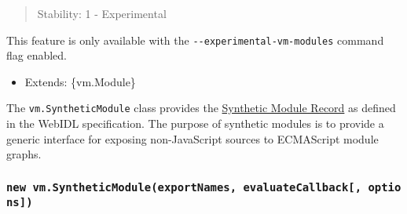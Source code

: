 \begin{quote}
Stability: 1 - Experimental
\end{quote}

This feature is only available with the
\texttt{-\/-experimental-vm-modules} command flag enabled.

\begin{itemize}
\tightlist
\item
  Extends: \{vm.Module\}
\end{itemize}

The \texttt{vm.SyntheticModule} class provides the
\href{https://heycam.github.io/webidl/\#synthetic-module-records}{Synthetic
Module Record} as defined in the WebIDL specification. The purpose of
synthetic modules is to provide a generic interface for exposing
non-JavaScript sources to ECMAScript module graphs.

\begin{Shaded}
\begin{Highlighting}[]
\OperatorTok{=} \NormalTok{(}\NormalTok{)}\OperatorTok{;}

\OperatorTok{=} \OperatorTok{;}
\OperatorTok{=} \NormalTok{([}\NormalTok{]}\OperatorTok{,} \NormalTok{() \{}
  \OperatorTok{=} \OperatorTok{;}
  \NormalTok{(}\OperatorTok{,}\OperatorTok{;}
\NormalTok{\})}\OperatorTok{;}

\end{Highlighting}
\end{Shaded}

\subsubsection{\texorpdfstring{\texttt{new\ vm.SyntheticModule(exportNames,\ evaluateCallback{[},\ options{]})}}{new vm.SyntheticModule(exportNames, evaluateCallback{[}, options{]})}}\label{new-vm.syntheticmoduleexportnames-evaluatecallback-options}

